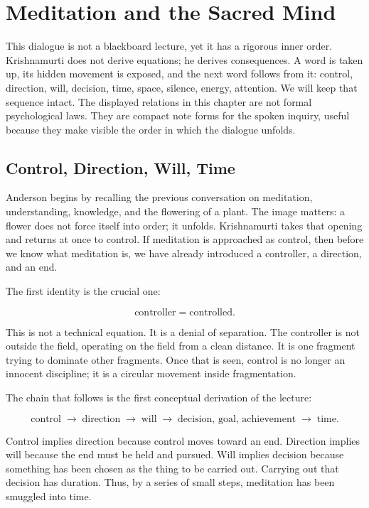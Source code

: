 \chapter{Meditation and the Sacred Mind}

This dialogue is not a blackboard lecture, yet it has a rigorous inner order. Krishnamurti does not derive equations; he derives consequences. A word is taken up, its hidden movement is exposed, and the next word follows from it: control, direction, will, decision, time, space, silence, energy, attention. We will keep that sequence intact. The displayed relations in this chapter are not formal psychological laws. They are compact note forms for the spoken inquiry, useful because they make visible the order in which the dialogue unfolds.

\section{Control, Direction, Will, Time}

Anderson begins by recalling the previous conversation on meditation, understanding, knowledge, and the flowering of a plant. The image matters: a flower does not force itself into order; it unfolds. Krishnamurti takes that opening and returns at once to control. If meditation is approached as control, then before we know what meditation is, we have already introduced a controller, a direction, and an end.

The first identity is the crucial one:

\begin{equation}
\text{controller} = \text{controlled}.
\end{equation}

This is not a technical equation. It is a denial of separation. The controller is not outside the field, operating on the field from a clean distance. It is one fragment trying to dominate other fragments. Once that is seen, control is no longer an innocent discipline; it is a circular movement inside fragmentation.

The chain that follows is the first conceptual derivation of the lecture:

\begin{equation}
\text{control}
\;\longrightarrow\;
\text{direction}
\;\longrightarrow\;
\text{will}
\;\longrightarrow\;
\text{decision, goal, achievement}
\;\longrightarrow\;
\text{time}.
\end{equation}

Control implies direction because control moves toward an end. Direction implies will because the end must be held and pursued. Will implies decision because something has been chosen as the thing to be carried out. Carrying out that decision has duration. Thus, by a series of small steps, meditation has been smuggled into time.

